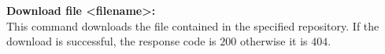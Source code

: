 \textbf{Download file <filename>:}\\
This command downloads the file contained in the specified repository. If the download is successful, the response code is $200$ otherwise it is $404$.

\begin{table}[htbp]
    \centering
\end{table}
